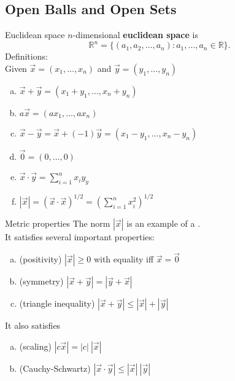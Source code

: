\documentclass{beamer}
\begin{document}
\subsection{Open Balls and Open Sets}

\begin{frame}{Euclidean space}
\pause
$n$-dimensional \textbf{euclidean space} is
\pause
$$\mathbb{R}^n = \{(a_1,a_2,\dots,a_n): a_1,\dots, a_n\in\mathbb{R}\}.$$
\pause
Definitions:\\
\pause
Given $\vec x = (x_1,\dots, x_n)$ and $\vec y = (y_1,\dots, y_n)$
\begin{enumerate}[(a)]
\pause
\item $\vec x + \vec y = (x_1+y_1,\dots,x_n+y_n)$
\pause
\item $a\vec x = (ax_1,\dots, ax_n)$
\pause
\item $\vec x - \vec y = \vec x + (-1)\vec y = (x_1-y_1,\dots,x_n-y_n)$
\pause
\item $\vec 0 = (0,\dots, 0)$
\pause
\item $\vec x\cdot\vec y = \sum_{i=1}^n x_iy_y$
\pause
\item $|\vec x| = (\vec x\cdot\vec x)^{1/2} = \left(\sum_{i=1}^nx_i^2\right)^{1/2}$
\end{enumerate}
\end{frame}

\begin{frame}{Metric properties}
\pause
The norm $|\vec x|$ is an example of a .\\
\pause
It satisfies several important properties:
\pause
\begin{thm}
\begin{enumerate}[(a)]
\pause
\item (positivity) $|\vec x| \geq 0$ with equality iff $\vec x = \vec 0$
\pause
\item (symmetry) $|\vec x + \vec y| = |\vec y + \vec x|$
\pause
\item (triangle inequality) $|\vec x + \vec y| \leq |\vec x| + | \vec y|$
\end{enumerate}
\end{thm}
\pause
It also satisfies 
\pause
\begin{enumerate}[(a)]
\pause
\item (scaling)  $|c\vec x| = |c|\ |\vec x|$
\pause
\item (Cauchy-Schwartz) $|\vec x\cdot\vec y|\leq |\vec x|\ |\vec y|$
\end{enumerate}
\end{frame}
\end{document}
